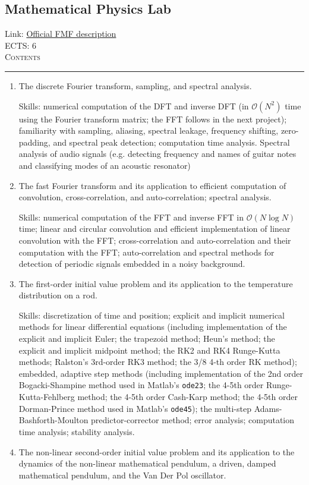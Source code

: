 \documentclass[11pt, a4paper]{article}
\newenvironment{course}[3]{
\subsection{#1}%
Link: \href{#2}{Official FMF description}\\%
ECTS: #3%
\vspace{1ex}
\\
{\large \textsc{Contents}}\\[-0.9ex]%
\rule{\textwidth}{0.5pt}
\vspace{-3ex}
}
{}
\newenvironment{chapter}[1]{
\begin{tcolorbox}[title=#1, breakable]
}
{\end{tcolorbox}}
\begin{document}
\begin{course}{Mathematical Physics Lab}{https://www.fmf.uni-lj.si/en/study-physics/programmes/1fiz/2020/7000777/courses/1159/}{6}
\begin{chapter}{Projects}
\begin{enumerate}
            \item The discrete Fourier transform, sampling, and spectral analysis.

            Skills: numerical computation of the DFT and inverse DFT (in $ \mathcal{O}(N^{2}) $ time using the Fourier transform matrix; the FFT follows in the next project); familiarity with sampling, aliasing, spectral leakage, frequency shifting, zero-padding, and spectral peak detection; computation time analysis.
            Spectral analysis of audio signals (e.g. detecting frequency and names of guitar notes and classifying modes of an acoustic resonator)
        
            \item The fast Fourier transform and its application to efficient computation of convolution, cross-correlation, and auto-correlation; spectral analysis.

            Skills: numerical computation of the FFT and inverse FFT in $ \mathcal{O}(N \log N) $ time; linear and circular convolution and efficient implementation of linear convolution with the FFT; cross-correlation and auto-correlation and their computation with the FFT; auto-correlation and spectral methods for detection of periodic signals embedded in a noisy background.

            \item The first-order initial value problem and its application to the temperature distribution on a rod.

            Skills: discretization of time and position; explicit and implicit numerical methods for linear differential equations (including implementation of the explicit and implicit Euler; the trapezoid method; Heun's method; the explicit and implicit midpoint method; the RK2 and RK4 Runge-Kutta methods; Ralston's 3rd-order RK3 method; the 3/8 4-th order RK method); embedded, adaptive step methods (including implementation of the 2nd order Bogacki-Shampine method used in Matlab's \texttt{ode23}; the 4-5th order Runge-Kutta-Fehlberg method; the 4-5th order Cash-Karp method; the 4-5th order Dorman-Prince method used in Matlab's \texttt{ode45}); the multi-step Adams-Bashforth-Moulton predictor-corrector method; error analysis; computation time analysis; stability analysis.

            \item The non-linear second-order initial value problem and its application to the dynamics of the non-linear mathematical pendulum, a driven, damped mathematical pendulum, and the Van Der Pol oscillator.


\end{enumerate}
\end{chapter}
\end{course}
\end{document}
